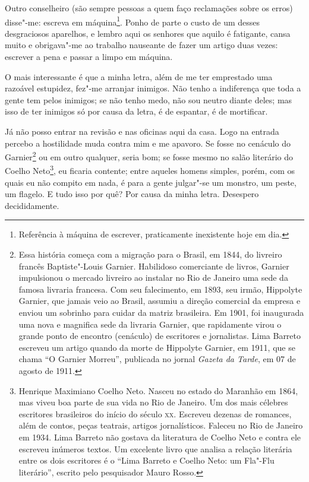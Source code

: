 Outro conselheiro (são sempre pessoas a quem faço reclamações sobre os
erros) disse"-me: escreva em máquina\footnote{Referência à máquina de
  escrever, praticamente inexistente hoje em dia.}. Ponho de parte o
custo de um desses desgraciosos aparelhos, e lembro aqui os senhores que
aquilo é fatigante, cansa muito e obrigava"-me ao trabalho nauseante de
fazer um artigo duas vezes: escrever a pena e passar a limpo em máquina.

O mais interessante é que a minha letra, além de me ter emprestado uma
razoável estupidez, fez"-me arranjar inimigos. Não tenho a indiferença
que toda a gente tem pelos inimigos; se não tenho medo, não sou neutro
diante deles; mas isso de ter inimigos só por causa da letra, é de
espantar, é de mortificar.

Já não posso entrar na revisão e nas oficinas aqui da casa. Logo na
entrada percebo a hostilidade muda contra mim e me apavoro. Se fosse no
cenáculo do Garnier\footnote{Essa história começa com a migração para o
  Brasil, em 1844, do livreiro francês Baptiste"-Louis Garnier.
  Habilidoso comerciante de livros, Garnier impulsionou o mercado
  livreiro ao instalar no Rio de Janeiro uma sede da famosa livraria
  francesa. Com seu falecimento, em 1893, seu irmão, Hippolyte Garnier,
  que jamais veio ao Brasil, assumiu a direção comercial da empresa e
  enviou um sobrinho para cuidar da matriz brasileira. Em 1901, foi
  inaugurada uma nova e magnifica sede da livraria Garnier, que
  rapidamente virou o grande ponto de encontro (cenáculo) de escritores
  e jornalistas. Lima Barreto escreveu um artigo quando da morte de
  Hippolyte Garnier, em 1911, que se chama ``O Garnier Morreu'',
  publicada no jornal \emph{Gazeta da Tarde}, em 07 de agosto de 1911.}
ou em outro qualquer, seria bom; se fosse mesmo no salão literário do
Coelho Neto\footnote{Henrique Maximiano Coelho Neto. Nasceu no estado do
  Maranhão em 1864, mas viveu boa parte de sua vida no Rio de Janeiro.
  Um dos mais célebres escritores brasileiros do início do século \textsc{xx}.
  Escreveu dezenas de romances, além de contos, peças teatrais, artigos
  jornalísticos. Faleceu no Rio de Janeiro em 1934. Lima Barreto não
  gostava da literatura de Coelho Neto e contra ele escreveu inúmeros
  textos. Um excelente livro que analisa a relação literária entre os
  dois escritores é o ``Lima Barreto e Coelho Neto: um Fla"-Flu
  literário'', escrito pelo pesquisador Mauro Rosso.}, eu ficaria
contente; entre aqueles homens simples, porém, com os quais eu não
compito em nada, é para a gente julgar"-se um monstro, um peste, um
flagelo. E tudo isso por quê? Por causa da minha letra. Desespero
decididamente.

